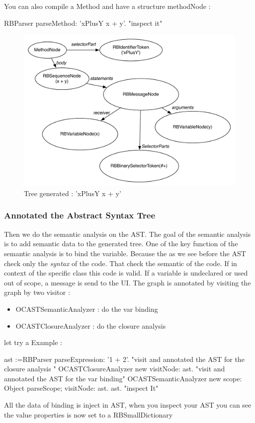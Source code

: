 \documentclass[a4paper,10pt,twoside]{book}
\begin{document}
You can also compile a Method and have a structure methodNode :
\begin{code}{}
RBParser parseMethod: 'xPlusY x + y'.
"inspect it"
\end{code}
\begin{figure}[ht]\centering
	\includegraphics[width=0.7\linewidth]{ASTbeforeSemanticAnalysis}
	\caption{Tree generated :  'xPlusY x + y' }
\end{figure}


\subsubsection{Annotated the Abstract Syntax Tree}
Then we do the semantic analysis on the AST. The goal of the semantic analysis is to add semantic data to the generated tree. One of the key function of the semantic analysis is to bind the variable. Because the as we see before the AST check only the \emph{syntax} of the code. That check the semantic of the code. If in context of the specific class this code is valid. If a variable is undeclared or used out of scope, a message is send to the UI. 
The graph is annotated by visiting the graph by two visitor :
\begin{itemize}
\item OCASTSemanticAnalyzer : do the var binding
\item OCASTClosureAnalyzer : do the closure analysis
\end{itemize}
let try a Example :

\begin{code}{}
ast :=RBParser parseExpression: '1 + 2'.
"visit and annotated the AST for the closure analysis "
OCASTClosureAnalyzer new visitNode: ast.
"visit and annotated the AST for the var binding"
OCASTSemanticAnalyzer new
		scope: Object parseScope;
		visitNode: ast.
ast. "inspect It"
\end{code}
All the data of binding is inject in AST, when you inspect your AST you can see the value properties is now set to a RBSmallDictionary 
\end{document}
